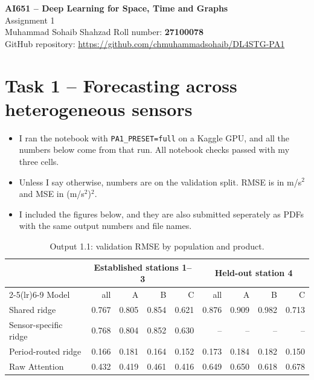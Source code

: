 \documentclass[10pt]{article}
\begin{document}
\begin{center}
{\Large\bfseries AI651 -- Deep Learning for Space, Time and Graphs}\\[2pt]
{\large Assignment 1}\\[6pt]
Muhammad Sohaib Shahzad \quad Roll number: \textbf{27100078}\\[2pt]
GitHub repository: \url{https://github.com/chmuhammadsohaib/DL4STG-PA1}
\end{center}

\section{Task 1 -- Forecasting across heterogeneous sensors}
\begin{itemize}
\item I ran the notebook with \texttt{PA1\_PRESET=full} on a Kaggle GPU, and all the numbers below come from that run. All notebook checks passed with my three cells.
\item Unless I say otherwise, numbers are on the validation split. RMSE is in m/s$^2$ and MSE in (m/s$^2$)$^2$.
\item I included the figures below, and they are also submitted seperately as PDFs with the same output numbers and file names.
\end{itemize}

\begin{table}[H]\centering\small
\begin{tabular}{lrrrrrrrr}
\toprule
& \multicolumn{4}{c}{Established stations 1--3} & \multicolumn{4}{c}{Held-out station 4} \\
\cmidrule(lr){2-5}\cmidrule(lr){6-9}
Model & all & A & B & C & all & A & B & C \\
\midrule
Shared ridge & 0.767 & 0.805 & 0.854 & 0.621 & 0.876 & 0.909 & 0.982 & 0.713 \\
Sensor-specific ridge & 0.768 & 0.804 & 0.852 & 0.630 & -- & -- & -- & -- \\
Period-routed ridge & 0.166 & 0.181 & 0.164 & 0.152 & 0.173 & 0.184 & 0.182 & 0.150 \\
Raw Attention & 0.432 & 0.419 & 0.461 & 0.416 & 0.649 & 0.650 & 0.618 & 0.678 \\
\bottomrule
\end{tabular}
\caption{Output 1.1: validation RMSE by population and product.}\label{tab:o11}
\end{table}
\end{document}
